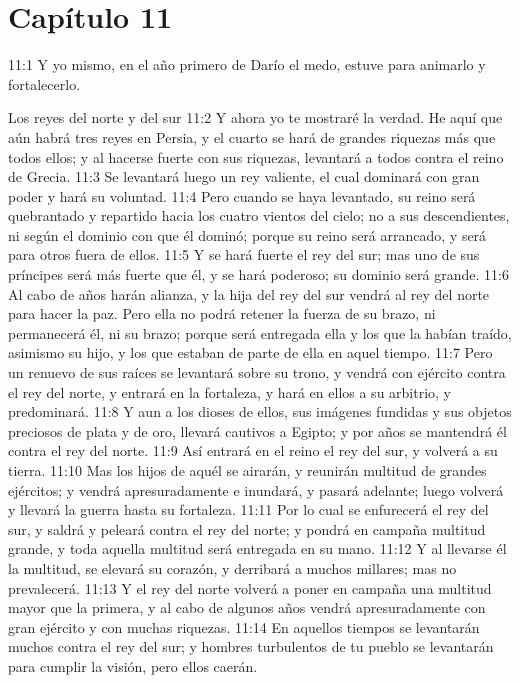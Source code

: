 \section*{Capítulo 11 }
11:1 Y yo mismo, en el año primero de Darío el medo, estuve para animarlo y fortalecerlo. 
 
Los reyes del norte y del sur 
11:2 Y ahora yo te mostraré la verdad. He aquí que aún habrá tres reyes en Persia, y el cuarto se hará de grandes riquezas más que todos ellos; y al hacerse fuerte con sus riquezas, levantará a todos contra el reino de Grecia. 
11:3 Se levantará luego un rey valiente, el cual dominará con gran poder y hará su voluntad. 
11:4 Pero cuando se haya levantado, su reino será quebrantado y repartido hacia los cuatro vientos del cielo; no a sus descendientes, ni según el dominio con que él dominó; porque su reino será arrancado, y será para otros fuera de ellos. 
11:5 Y se hará fuerte el rey del sur; mas uno de sus príncipes será más fuerte que él, y se hará poderoso; su dominio será grande. 
11:6 Al cabo de años harán alianza, y la hija del rey del sur vendrá al rey del norte para hacer la paz. Pero ella no podrá retener la fuerza de su brazo, ni permanecerá él, ni su brazo; porque será entregada ella y los que la habían traído, asimismo su hijo, y los que estaban de parte de ella en aquel tiempo. 
11:7 Pero un renuevo de sus raíces se levantará sobre su trono, y vendrá con ejército contra el rey del norte, y entrará en la fortaleza, y hará en ellos a su arbitrio, y predominará. 
11:8 Y aun a los dioses de ellos, sus imágenes fundidas y sus objetos preciosos de plata y de oro, llevará cautivos a Egipto; y por años se mantendrá él contra el rey del norte. 
11:9 Así entrará en el reino el rey del sur, y volverá a su tierra. 
11:10 Mas los hijos de aquél se airarán, y reunirán multitud de grandes ejércitos; y vendrá apresuradamente e inundará, y pasará adelante; luego volverá y llevará la guerra hasta su fortaleza. 
11:11 Por lo cual se enfurecerá el rey del sur, y saldrá y peleará contra el rey del norte; y pondrá en campaña multitud grande, y toda aquella multitud será entregada en su mano. 
11:12 Y al llevarse él la multitud, se elevará su corazón, y derribará a muchos millares; mas no prevalecerá. 
11:13 Y el rey del norte volverá a poner en campaña una multitud mayor que la primera, y al cabo de algunos años vendrá apresuradamente con gran ejército y con muchas riquezas. 
11:14 En aquellos tiempos se levantarán muchos contra el rey del sur; y hombres turbulentos de tu pueblo se levantarán para cumplir la visión, pero ellos caerán. 
